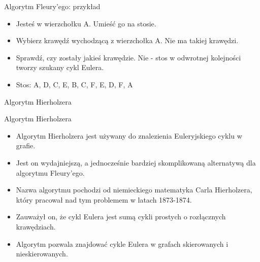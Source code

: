 \documentclass[polish,envcountsect,10pt]{beamer}
\begin{document}
\begin{frame}{Algorytm Fleury'ego: przykład}
    \begin{itemize}
        \item Jesteś w wierzchołku A. Umieść go na stosie.
        \item Wybierz krawędź wychodzącą z wierzchołka A. Nie ma takiej krawędzi.
        \item Sprawdź, czy zostały jakieś krawędzie. Nie - stos w odwrotnej kolejności tworzy szukany cykl Eulera.
        \item Stos: A, D, C, E, B, C, F, E, D, F, A
    \end{itemize}
    \begin{center}
    \end{center}
\end{frame}

\begin{frame}{Algorytm Hierholzera}
    \begin{block}{Algorytm Hierholzera}
        \begin{itemize}
            \item Algorytm Hierholzera jest używany do znalezienia Euleryjskiego cyklu w grafie.
            \item Jest on wydajniejszą, a jednocześnie bardziej skomplikowaną alternatywą dla algorytmu Fleury'ego.
            \item Nazwa algorytmu pochodzi od niemieckiego matematyka Carla Hierholzera, który pracował nad tym problemem w latach 1873-1874.
            \item Zauważył on, że cykl Eulera jest sumą cykli prostych o rozłącznych krawędziach.
            \item Algorytm pozwala znajdować cykle Eulera w grafach skierowanych i nieskierowanych.
        \end{itemize}
    \end{block}
\end{frame}
    
\end{document}
